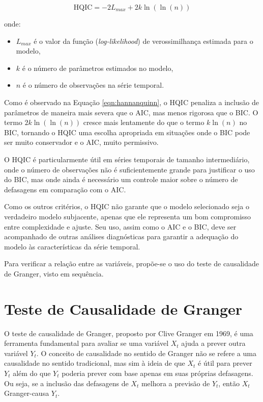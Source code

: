 \documentclass[12pt,oneside,a4paper,chapter=TITLE,english,brazil,sumario=abnt-6027-2012]{abntex2}
\begin{document}
\begin{equation}
	\label{eqn:hannanquinn}
	\text{HQIC} = -2 L_{max} + 2k \ln(\ln(n))
\end{equation}

onde:

\begin{itemize}
	\item \( L_{max} \) é o valor da função (\textit{log-likelihood}) de verossimilhança estimada para o modelo,
	\item \( k \) é o número de parâmetros estimados no modelo,
	\item \( n \) é o número de observações na série temporal.
\end{itemize}

Como é observado na Equação \ref{eqn:hannanquinn}, o HQIC penaliza a inclusão de parâmetros de maneira mais severa que o AIC, mas menos rigorosa que o BIC. O termo \( 2k \ln(\ln(n)) \) cresce mais lentamente do que o termo \( k \ln(n) \) no BIC, tornando o HQIC uma escolha apropriada em situações onde o BIC pode ser muito conservador e o AIC, muito permissivo.

O HQIC é particularmente útil em séries temporais de tamanho intermediário, onde o número de observações não é suficientemente grande para justificar o uso do BIC, mas onde ainda é necessário um controle maior sobre o número de defasagens em comparação com o AIC. 

Como os outros critérios, o HQIC não garante que o modelo selecionado seja o verdadeiro modelo subjacente, apenas que ele representa um bom compromisso entre complexidade e ajuste. Seu uso, assim como o AIC e o BIC, deve ser acompanhado de outras análises diagnósticas para garantir a adequação do modelo às características da série temporal.

Para verificar a relação entre as variáveis, propõe-se o uso do teste de causalidade de Granger, visto em sequência.

\section{Teste de Causalidade de Granger}

O teste de causalidade de Granger, proposto por Clive Granger em 1969, é uma ferramenta fundamental para avaliar se uma variável \( X_t \) ajuda a prever outra variável \( Y_t \). O conceito de causalidade no sentido de Granger não se refere a uma causalidade no sentido tradicional, mas sim à ideia de que \( X_t \) é útil para prever \( Y_t \) além do que \( Y_t \) poderia prever com base apenas em suas próprias defasagens. Ou seja, se a inclusão das defasagens de \( X_t \) melhora a previsão de \( Y_t \), então \( X_t \) Granger-causa \( Y_t \).
\end{document}
